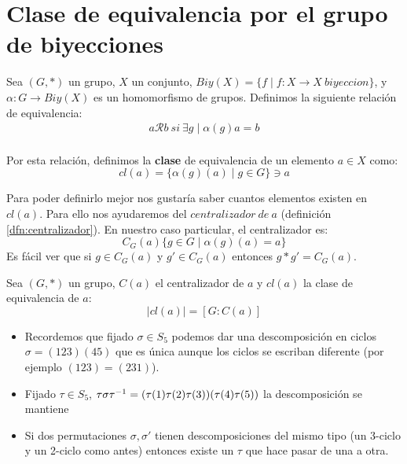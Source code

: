 \section{Clase de equivalencia por el grupo de biyecciones}
\begin{dfn}
Sea $(G, \ast)$ un grupo, $X$ un conjunto, $Biy(X) = \{f\mid f: X\longrightarrow X\ biyeccion\}$, y $\alpha: G \longrightarrow Biy(X)$ es un homomorfismo de grupos. Definimos la siguiente relación de equivalencia:
\begin{align*}
	a\mathcal{R}b\ si\ \exists g \mid \alpha(g)a=b
\end{align*}\\
Por esta relación, definimos la \textbf{clase} de equivalencia de un elemento $a \in X$ como:  \[cl(a)=\{ \alpha(g)(a)\mid g\in G \} \ni a \]
\end{dfn}
Para poder definirlo mejor nos gustaría saber cuantos elementos existen en $cl(a)$. Para ello nos ayudaremos del $centralizador\ de\ a$ (definición \ref{dfn:centralizador}). En nuestro caso particular, el centralizador es:
\[ C_G(a) \{g\in G \mid \alpha(g)(a) = a \} \]
Es fácil ver que si $g \in C_G(a)$ y $g' \in C_G(a)$ entonces $g \ast g' = C_G(a)$.
\begin{thm}
Sea $(G, \ast)$ un grupo, $C(a)$ el centralizador de $a$ y $cl(a)$ la clase de equivalencia de $a$:
\[ |cl(a)| = \left[ G:C(a) \right] \]
\end{thm}
\begin{itemize}
	\item Recordemos que fijado $\sigma \in S_5$ podemos dar una descomposición en ciclos $\sigma = (123)(45)$ que es única aunque los ciclos se escriban diferente (por ejemplo $(123) = (231)$).
	
	\item Fijado $\tau \in S_5$, $\tau \sigma \tau^{-1} = (\tau(1)\tau(2)\tau(3))(\tau(4)\tau(5))$ la descomposición se mantiene
	
	\item Si dos permutaciones $\sigma, \sigma'$ tienen descomposiciones del mismo tipo (un 3-ciclo y un 2-ciclo como antes) entonces existe un $\tau$ que hace pasar de una a otra.
\end{itemize}

